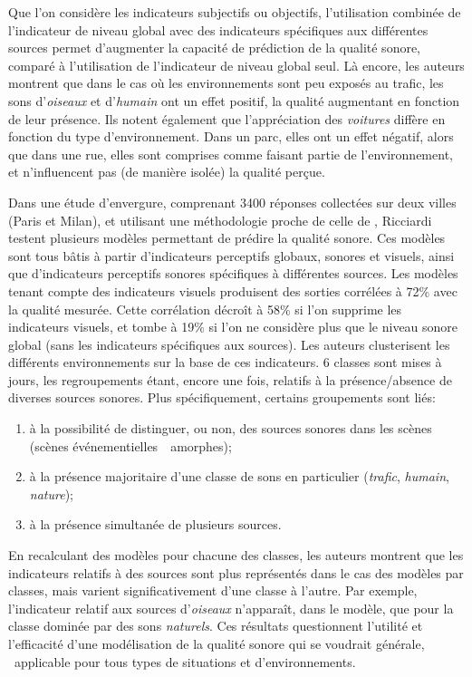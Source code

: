 Que l'on considère les indicateurs subjectifs ou objectifs, l'utilisation combinée de l'indicateur de niveau global avec des indicateurs spécifiques aux différentes sources permet d'augmenter la capacité de prédiction de la qualité sonore, comparé à l'utilisation de l'indicateur de niveau global seul. Là encore, les auteurs montrent que dans le cas où les environnements sont peu exposés au trafic, les sons d'\emph{oiseaux} et d'\emph{humain} ont un effet positif, la qualité augmentant en fonction de leur présence. Ils notent également que l'appréciation des \emph{voitures} diffère en fonction du type d'environnement. Dans un parc, elles ont un effet négatif, alors que dans une rue, elles sont comprises comme faisant partie de l'environnement, et n'influencent pas (de manière isolée) la qualité perçue.

Dans une étude d'envergure, comprenant 3400 réponses collectées sur deux villes (Paris et Milan), et utilisant une méthodologie proche de celle de \citep{lavandier2006contribution}, Ricciardi~\al \citep{ricciardi2015sound} testent plusieurs modèles permettant de prédire la qualité sonore. Ces modèles sont tous bâtis à partir d'indicateurs perceptifs globaux, sonores et visuels, ainsi que d'indicateurs perceptifs sonores spécifiques à différentes sources. Les modèles tenant compte des indicateurs visuels produisent des sorties corrélées à 72\% avec la qualité mesurée. Cette corrélation décroît à 58\% si l'on supprime les indicateurs visuels, et tombe à 19\% si l'on ne considère plus que le niveau sonore global (sans les indicateurs spécifiques aux sources). Les auteurs clusterisent les différents environnements sur la base de ces indicateurs. 6 classes sont mises à jours, les regroupements étant, encore une fois, relatifs à la présence/absence de diverses sources sonores. Plus spécifiquement, certains groupements sont liés:

\begin{enumerate}
\item à la possibilité de distinguer, ou non, des sources sonores dans les scènes (scènes événementielles~\vs~amorphes);
\item à la présence majoritaire d'une classe de sons en particulier (\emph{trafic}, \emph{humain}, \emph{nature});
\item à la présence simultanée de plusieurs sources.
\end{enumerate}

En recalculant des modèles pour chacune des classes, les auteurs montrent que les indicateurs relatifs à des sources sont plus représentés dans le cas des modèles par classes, mais varient significativement d'une classe à l'autre. Par exemple, l’indicateur relatif aux sources d'\emph{oiseaux} n'apparaît, dans le modèle, que pour la classe dominée par des sons \emph{naturels}. Ces résultats questionnent l'utilité et l'efficacité d'une modélisation de la qualité sonore qui se voudrait générale, \ie~applicable pour tous types de situations et d'environnements.

